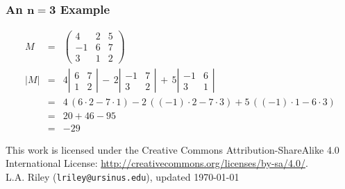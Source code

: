 \documentclass[12pt]{article}
\begin{document}
\subsubsection*{An $\mathbf{n=3}$ Example}
\begin{eqnarray}
\nonumber
M &=&
\left(
\begin{array}{cccc}
 4 &  2 & 5 \\
-1 &  6 & 7 \\
 3 &  1 & 2
\end{array}
\right) \\
\nonumber
|M| &=& 
4
\left|
\begin{array}{cccc}
6 & 7 \\
1 & 2
\end{array}
\right| 
\,-\, 2
\left|
\begin{array}{cccc}
-1 & 7 \\
 3 & 2
\end{array}
\right| 
\,+\, 5
\left|
\begin{array}{cccc}
-1 & 6 \\
 3 & 1
\end{array}
\right|\\
\nonumber
&=& 4 \, (6 \cdot 2 - 7 \cdot 1)
  - 2 \, ((-1) \cdot 2 - 7 \cdot 3)
  + 5 \, ((-1) \cdot 1 - 6 \cdot 3)\\
\nonumber
&=& 20 + 46 - 95 \\
&=& -29
\end{eqnarray}

{\footnotesize
  \noindent
  \hrulefill
  
  \noindent
  This work is licensed under the Creative Commons
  Attribution-ShareAlike 4.0 International License: 
  \url{http://creativecommons.org/licenses/by-sa/4.0/}.\\

  \noindent
  L.A. Riley (\texttt{lriley@ursinus.edu}), updated \today
}
\end{document}
